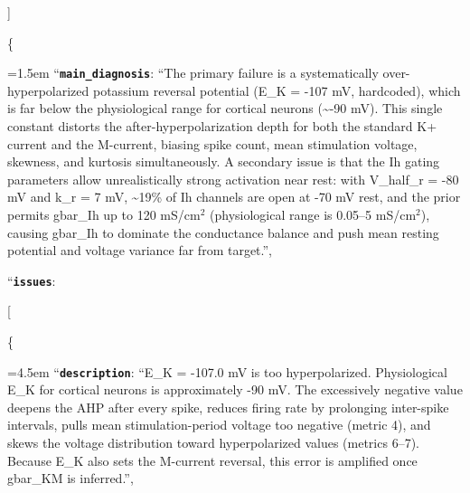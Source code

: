 \begin{tcolorbox}[
  breakable, enhanced,
  title={Output},
  colback=OutputBg, colframe=OutputFrame,
  coltitle=white, fonttitle=\bfseries\small,
  arc=2mm, boxrule=1pt,
  before upper={\small\setlength{\parindent}{0pt}\setlength{\parskip}{2pt}},
]
\par\noindent [[ \#\# feedback \#\# ]]\\
\noindent
\par\noindent \{
\par\noindent\hangindent=1.5em \hspace*{1.5em}``\textbf{\texttt{main\_diagnosis}}\textquotesingle\textquotesingle: ``The primary failure is a systematically over-hyperpolarized potassium reversal potential (E\_K = -107 mV, hardcoded), which is far below the physiological range for cortical neurons (\textasciitilde{}-90 mV). This single constant distorts the after-hyperpolarization depth for both the standard K+ current and the M-current, biasing spike count, mean stimulation voltage, skewness, and kurtosis simultaneously. A secondary issue is that the Ih gating parameters allow unrealistically strong activation near rest: with V\_half\_r = -80 mV and k\_r = 7 mV, \textasciitilde{}19\% of Ih channels are open at -70 mV rest, and the prior permits gbar\_Ih up to 120 mS/cm$^{2}$ (physiological range is 0.05--5 mS/cm$^{2}$), causing gbar\_Ih to dominate the conductance balance and push mean resting potential and voltage variance far from target.'',
\par\noindent \hspace*{1.5em}``\textbf{\texttt{issues}}\textquotesingle\textquotesingle:
\par\noindent \hspace*{1.5em}[
\par\noindent \hspace*{3.0em}\{
\par\noindent\hangindent=4.5em \hspace*{3.0em}\hspace*{1.5em}``\textbf{\texttt{description}}\textquotesingle\textquotesingle: ``E\_K = -107.0 mV is too hyperpolarized. Physiological E\_K for cortical neurons is approximately -90 mV. The excessively negative value deepens the AHP after every spike, reduces firing rate by prolonging inter-spike intervals, pulls mean stimulation-period voltage too negative (metric 4), and skews the voltage distribution toward hyperpolarized values (metrics 6--7). Because E\_K also sets the M-current reversal, this error is amplified once gbar\_KM is inferred.'',

\end{tcolorbox}
